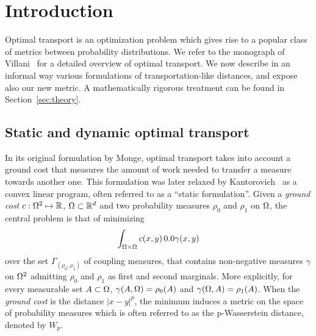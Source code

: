 


\section{Introduction}

Optimal transport is an optimization problem which gives rise to a popular class of metrics between probability distributions. We refer to the monograph of Villani~\cite{cedric2003topics} for a detailed overview of optimal transport. We now describe in an informal way various formulations of transportation-like distances, and expose also our new metric. A mathematically rigorous treatment can be found in Section~\ref{sec:theory}. 


\subsection{Static and dynamic optimal transport}

In its original formulation by Monge, optimal transport takes into account a ground cost that measures the amount of work needed to transfer a measure towards another one.  This formulation was later relaxed by Kantorovich~\cite{Kantorovich42} as a convex linear program, often referred to as a ``static formulation''. 
%
Given a \emph{ground cost} $c : \Omega^2 \mapsto \mathbb{R}$, $\Omega \subset \mathbb{R}^d$ and two probability measures $\rho_0$ and $\rho_1$ on $\Omega$, the central problem is that of minimizing
\begin{equation}
\int_{\Om \times \Om} c(x,y) \,\d\gamma (x,y)
\label{optimal transport problem}
\end{equation}
over the set $\Gamma_{(\rho_0,\rho_1)}$ of coupling measures, that contains non-negative measures $\gamma$ on $\Omega^2$ admitting $\rho_0$ and $\rho_1$ as first and second marginals. More explicitly, for every measurable set $A \subset \Omega$, $\gamma(A,\Omega)=\rho_0(A)$ and $\gamma(\Omega,A)=\rho_1(A)$. When the \emph{ground cost} is the distance $|x-y|^p$, the minimum induces a metric on the space of probability measures which is often referred to as the p-Wasserstein distance, denoted by $W_p$. 


